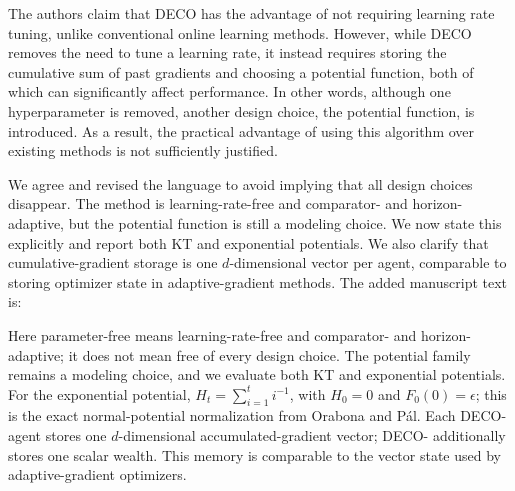\documentclass[12pt,english]{reviewresponse}
\newcommand{\algname}{{DECO}\xspace}
\begin{document}
\begin{revcomment}
    The authors claim that DECO has the advantage of not requiring learning rate tuning, unlike conventional online learning methods. However, while DECO removes the need to tune a learning rate, it instead requires storing the cumulative sum of past gradients and choosing a potential function, both of which can significantly affect performance. In other words, although one hyperparameter is removed, another design choice, the potential function, is introduced. As a result, the practical advantage of using this algorithm over existing methods is not sufficiently justified.
\end{revcomment}
\begin{revresponse}
    We agree and revised the language to avoid implying that all design choices disappear.  The method is learning-rate-free and comparator- and horizon-adaptive, but the potential function is still a modeling choice.  We now state this explicitly and report both KT and exponential potentials.  We also clarify that cumulative-gradient storage is one $d$-dimensional vector per agent, comparable to storing optimizer state in adaptive-gradient methods.
    The added manuscript text is:
    \begin{changes}
        Here parameter-free means learning-rate-free and comparator- and horizon-adaptive; it does not mean free of every design choice.
        The potential family remains a modeling choice, and we evaluate both KT and exponential potentials.
        For the exponential potential, $H_t=\sum_{i=1}^t i^{-1}$, with $H_0=0$ and $F_0(0)=\epsilon$; this is the exact normal-potential normalization from Orabona and P\'al.
        Each \algname{}- agent stores one $d$-dimensional accumulated-gradient vector; \algname{}- additionally stores one scalar wealth.
        This memory is comparable to the vector state used by adaptive-gradient optimizers.
    \end{changes}
\end{revresponse}
\end{document}
